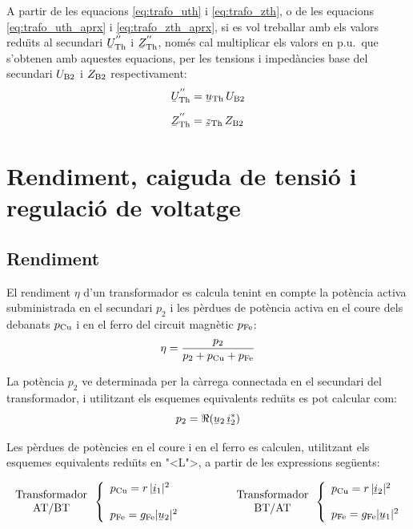A partir de les equacions \eqref{eq:trafo_uth} i
\eqref{eq:trafo_zth}, o de les equacions \eqref{eq:trafo_uth_aprx} i
\eqref{eq:trafo_zth_aprx}, si es vol treballar amb els valors
redu\"{\i}ts al secundari $\cmplx{U}\ped{Th}^{''}$ i
$\cmplx{Z}\ped{Th}^{''}$, nom\'{e}s cal multiplicar els valors en p.u.\
que s'obtenen amb aquestes equacions, per les tensions i imped\`{a}ncies
base del secundari $U_\mathrm{B2}$ i $Z_\mathrm{B2}$ respectivament:
\begin{align}
    \cmplx{U}\ped{Th}^{''} &= \cmplx{u}\ped{Th} \, U\ped{B2} \\[1ex]
    \cmplx{Z}\ped{Th}^{''} &= \cmplx{z}\ped{Th} \, Z\ped{B2}
\end{align}


\section{Rendiment, caiguda de tensi\'{o} i regulaci\'{o} de voltatge}

\subsection{Rendiment}

El rendiment $\eta$ d'un transformador es calcula tenint en compte la pot\`{e}ncia activa subministrada en el secundari $p_2$ i les p\`{e}rdues de pot\`{e}ncia activa en el coure dels debanats $p_\mathrm{Cu}$ i en el ferro del circuit magn\`{e}tic $p_\mathrm{Fe}$:
\begin{equation}
    \eta = \frac{p_2}{p_2 + p_\mathrm{Cu} + p_\mathrm{Fe}}
\end{equation}

La pot\`{e}ncia $p_2$ ve determinada per la c\`{a}rrega connectada en el secundari del transformador, i utilitzant els esquemes equivalents redu\"{\i}ts es pot calcular com:
\begin{equation}
    p_2 = \Re(\cmplx{u}_2 \,\cmplx{i}_2^*)
\end{equation}

Les p\`{e}rdues de pot\`{e}ncies  en el coure i en el ferro es calculen, utilitzant els esquemes equivalents redu\"{\i}ts en {"<}L{">}, a partir de les expressions seg\"{u}ents:

\begin{equation}
\begin{array}{c}\text{Transformador}\\
\text{AT/BT}
\end{array} \left\{
\begin{array}{l}
   p\ped{Cu} = r \,|\cmplx{i}_1|^2 \\[2.7ex]
   p\ped{Fe} = g\ped{Fe} |\cmplx{u}_2|^2
\end{array}
\right. \qquad\qquad
\begin{array}{c}\text{Transformador}\\
\text{BT/AT}
\end{array} \left\{
\begin{array}{l}
   p\ped{Cu} = r \,|\cmplx{i}_2|^2 \\[2.5ex]
   p\ped{Fe} = g\ped{Fe} |\cmplx{u}_1|^2
\end{array}
\right.
\end{equation}

